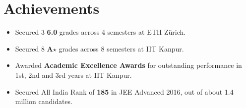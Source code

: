 %

\section*{Achievements}
\begin{itemize}[leftmargin=*,itemsep=0mm,label={\footnotesize\textbullet}]

\item Secured 3 \textbf{6.0} grades across 4 semesters at ETH Zürich.
\item Secured 8 \textbf{A$\star$} grades across 8 semesters at IIT Kanpur.
\item Awarded \textbf{Academic Excellence Awards} for outstanding performance in 1st, 2nd and 3rd years at IIT Kanpur.
\item Secured All India Rank of \textbf{185} in JEE Advanced 2016, out of about 1.4 million candidates.

\end{itemize}
